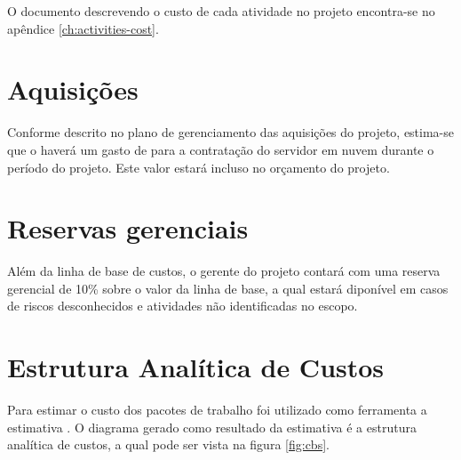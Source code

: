 O documento descrevendo o custo de cada atividade no projeto encontra-se no apêndice \ref{ch:activities-cost}.

\section{Aquisições}

Conforme descrito no plano de gerenciamento das aquisições do projeto, estima-se que o haverá um gasto de \procurementBudget{} para a contratação do servidor em nuvem durante o período do projeto. Este valor estará incluso no orçamento do projeto.

\section{Reservas gerenciais}
\label{ch:management-budget}

Além da linha de base de custos, o gerente do projeto contará com uma reserva gerencial de 10\% sobre o valor da linha de base, a qual estará diponível em casos de riscos desconhecidos e atividades não identificadas no escopo.

\section{Estrutura Analítica de Custos}

Para estimar o custo dos pacotes de trabalho foi utilizado como ferramenta a estimativa . O diagrama gerado como resultado da estimativa é a estrutura analítica de custos, a qual pode ser vista na figura \ref{fig:cbs}.


